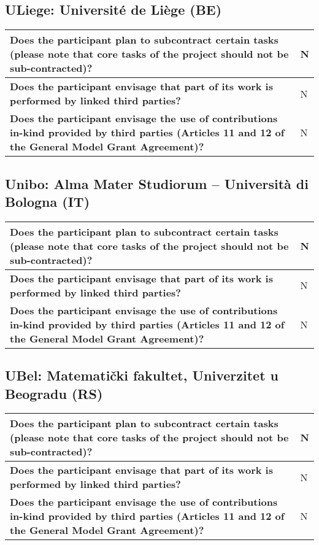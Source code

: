 \subsection{ULiege: Université de Liège (BE)}

\begin{longtable}{|p{}|p{}|}
\hline
{\bf Does the participant plan to subcontract certain tasks (please
  note that core tasks of the project should not be sub-contracted)?}
&
N
\\
\hline
{\bf Does the participant envisage that  part of its work is performed
  by linked third parties?}
&
N
\\
\hline
{\bf Does the participant envisage the use of contributions in-kind
provided by third parties (Articles 11 and 12 of the General Model
Grant Agreement)?}
&
N
\\
\hline
\end{longtable}

\subsection{Unibo: Alma Mater Studiorum – Università di Bologna (IT)}

\begin{longtable}{|p{}|p{}|}
\hline
{\bf Does the participant plan to subcontract certain tasks (please
  note that core tasks of the project should not be sub-contracted)?}
&
N
\\
\hline
{\bf Does the participant envisage that  part of its work is performed
  by linked third parties?}
&
N
\\
\hline
{\bf Does the participant envisage the use of contributions in-kind
provided by third parties (Articles 11 and 12 of the General Model
Grant Agreement)?}
&
N
\\
\hline
\end{longtable}

\subsection{UBel: Matematički fakultet, Univerzitet u Beogradu (RS)}

\begin{longtable}{|p{}|p{}|}
\hline
{\bf Does the participant plan to subcontract certain tasks (please
  note that core tasks of the project should not be sub-contracted)?}
&
N
\\
\hline
{\bf Does the participant envisage that  part of its work is performed
  by linked third parties?}
&
N
\\
\hline
{\bf Does the participant envisage the use of contributions in-kind
provided by third parties (Articles 11 and 12 of the General Model
Grant Agreement)?}
&
N
\\
\hline
\end{longtable}

